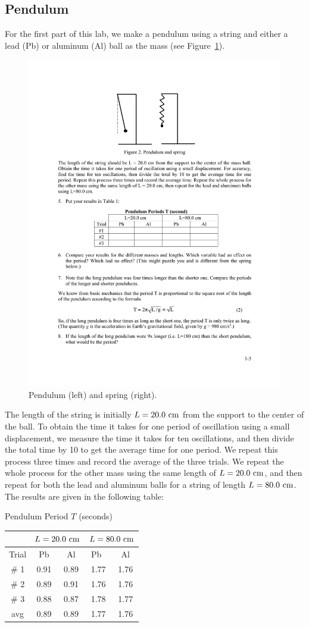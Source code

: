\documentclass[11pt]{NSF}
\begin{document}
\subsection{Pendulum}

For the first part of this lab, we make a pendulum using a 
string and either a lead (Pb) or aluminum (Al) ball as the
mass (see Figure~\ref{f:2}).
%
\begin{figure}[hbtp]
\begin{center}
\includegraphics[width=.5\textwidth]{fig1_2}
\caption{Pendulum (left) and spring (right).}
\label{f:2}
\end{center}
\end{figure}
%
The length of the string is initially $L = 20.0~{\rm cm}$ 
from the support to the center of the ball. 
To obtain the time it takes for one period of 
oscillation using a small displacement, we measure the 
time it takes for ten oscillations, and then divide 
the total time by 10 to get the average time for one period. 
We repeat this process three times and record the average 
of the three trials. 
We repeat the whole process for the other mass using 
the same length of $L = 20.0~{\rm cm}$, and 
then repeat for both the lead and aluminum balls for a
string of length $L=80.0~{\rm cm}$.
The results are given in the following table:
%
\begin{table}[hbtp]
\begin{center}
Pendulum Period $T$ (seconds)\\
\begin{tabular}{| c | c | c | c | c | }
\hline
&\multicolumn{2}{c}{$L=20.0~{\rm cm}$} \vrule
&\multicolumn{2}{c}{$L=80.0~{\rm cm}$} \vrule\\
\hline
Trial & \phantom{ }Pb\phantom{ } & Al & \phantom{ }Pb\phantom{ }\  & Al \\
\hline
\# 1 & 0.91 & 0.89 & 1.77 & 1.76 \\
\hline
\# 2 & 0.89 & 0.91 & 1.76 & 1.76 \\
\hline
\# 3 & 0.88 & 0.87 & 1.78 & 1.77 \\
\hline
avg  & 0.89 & 0.89 & 1.77 & 1.76 \\
\hline
\end{tabular}
\label{t:1}
\end{center}
\end{table}
\end{document}

